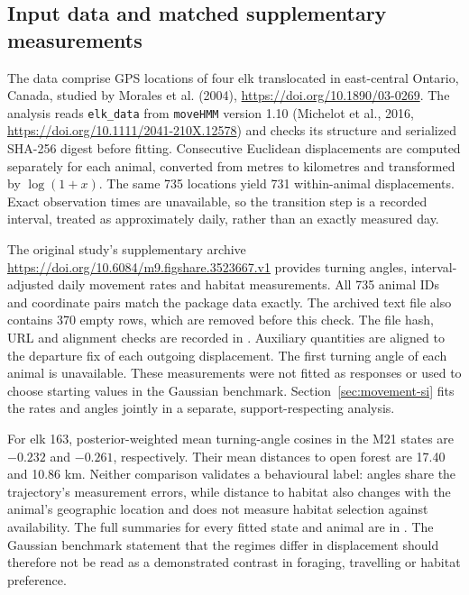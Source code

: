 \documentclass[11pt]{article}
\begin{document}
\subsection{Input data and matched supplementary measurements}

The data comprise GPS locations of four elk translocated in east-central
Ontario, Canada, studied by Morales et al. (2004),
\url{https://doi.org/10.1890/03-0269}. The analysis reads
\texttt{elk\_data} from \texttt{moveHMM} version 1.10
(Michelot et al., 2016, \url{https://doi.org/10.1111/2041-210X.12578})
and checks its structure and serialized SHA-256 digest before fitting. Consecutive
Euclidean displacements are computed separately for each animal, converted
from metres to kilometres and transformed by $\log(1+x)$. The same 735
locations yield 731 within-animal displacements.
Exact observation times are unavailable, so the transition step is a recorded
interval, treated as approximately daily, rather than an exactly measured day.

The original study's supplementary archive
\url{https://doi.org/10.6084/m9.figshare.3523667.v1} provides turning angles,
interval-adjusted daily movement rates and habitat measurements. All 735
animal IDs and coordinate pairs match the package data exactly. The archived
text file also contains 370 empty rows, which are removed before this check.
The file hash, URL and alignment checks are recorded in
. Auxiliary quantities are
aligned to the departure fix of each outgoing displacement. The first turning
angle of each animal is unavailable. These measurements were not fitted as
responses or used to choose starting values in the Gaussian benchmark.
Section~\ref{sec:movement-si} fits the rates and angles jointly in a separate, support-respecting
analysis.

For elk 163, posterior-weighted mean turning-angle cosines in the M21 states
are $-0.232$ and $-0.261$, respectively. Their mean distances to open forest
are 17.40 and 10.86 km. Neither comparison validates a behavioural label:
angles share the trajectory's measurement errors, while distance to habitat
also changes with the animal's geographic location and does not measure
habitat selection against availability. The full summaries for every fitted
state and animal are in .
The Gaussian benchmark statement that the regimes differ in displacement
should therefore not be read as a demonstrated contrast in foraging,
travelling or habitat preference.
\end{document}
